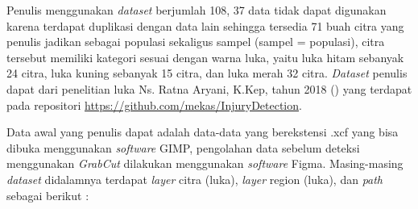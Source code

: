 Penulis menggunakan \emph{dataset} berjumlah 108, 37 data tidak dapat digunakan 
karena terdapat duplikasi dengan data lain sehingga tersedia 71 buah citra 
yang penulis jadikan sebagai populasi sekaligus sampel (sampel = populasi),
citra tersebut memiliki kategori sesuai dengan warna luka, yaitu luka hitam sebanyak
24 citra, luka kuning sebanyak 15 citra, dan luka merah 32 citra. \emph{Dataset}
penulis dapat dari penelitian luka Ns. Ratna Aryani, K.Kep, tahun 2018 (\cite{Aryani:2018})
yang terdapat pada repositori \url{https://github.com/mekas/InjuryDetection}.

Data awal yang penulis dapat adalah data-data yang berekstensi .xcf yang bisa 
dibuka menggunakan \emph{software} GIMP, pengolahan data sebelum deteksi menggunakan
\emph{GrabCut} dilakukan menggunakan \emph{software} Figma. Masing-masing \emph{dataset} 
didalamnya terdapat \emph{layer} citra (luka), \emph{layer} region (luka), dan 
\emph{path} sebagai berikut :


